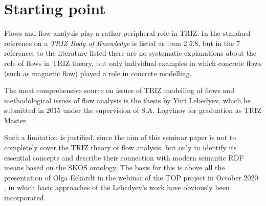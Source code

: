 \documentclass[a4paper,11pt]{article}
\begin{document}
    \section{Starting point} 

    Flows and flow analysis play a rather peripheral role in TRIZ.  In the
    standard reference \cite{Petrov2007} on a \emph{TRIZ Body of Knowledge} is
    listed as item 2.5.8, but in the 7 references to the literature listed there
    are no systematic explanations about the role of flows in TRIZ theory, but
    only individual examples in which concrete flows (such as magnetic flow)
    played a role in concrete modelling.

    The most comprehensive source on issues of TRIZ modelling of flows and
    methodological issues of flow analysis is the thesis \cite{Lebedyev2015} by
    Yuri Lebedyev, which he submitted in 2015 under the supervision of S.A. 
    Logvinov for graduation as TRIZ Master.

    Such a limitation is justified, since the aim of this seminar paper is not to
    completely cover the TRIZ theory of flow analysis, but only to identify its
    essential concepts and describe their connection with modern semantic RDF
    means based on the SKOS ontology. The basis for this is above all the
    presentation of Olga Eckardt in the webinar of the TOP project in October 2020
    \cite{Eckardt2020}, in which basic approaches of the Lebedyev's work have
    obviously been incorporated.
\end{document}
